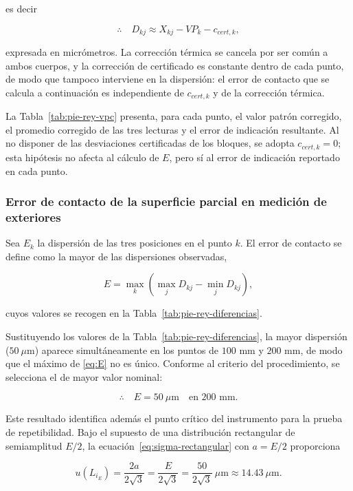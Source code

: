 es decir

\begin{equation}
  \therefore\quad D_{kj} \approx X_{kj} - VP_k - c_{cert,k},
  \label{eq:D}
\end{equation}

expresada en micrómetros. La corrección térmica se cancela por ser común a ambos
cuerpos, y la corrección de certificado es constante dentro de cada punto, de modo
que tampoco interviene en la dispersión: el error de contacto que se calcula a
continuación es independiente de $c_{cert,k}$ y de la corrección térmica.

La Tabla~\ref{tab:pie-rey-vpc} presenta, para cada punto, el valor patrón corregido,
el promedio corregido de las tres lecturas y el error de indicación resultante. Al no
disponer de las desviaciones certificadas de los bloques, se adopta $c_{cert,k} = 0$;
esta hipótesis no afecta al cálculo de $E$, pero sí al error de indicación reportado
en cada punto.



\subsubsection*{Error de contacto de la superficie parcial en medición de exteriores}

Sea $E_k$ la dispersión de las tres posiciones en el punto $k$. El error de contacto
se define como la mayor de las dispersiones observadas,

\begin{equation}
  E = \max_k \left( \max_j D_{kj} - \min_j D_{kj} \right),
  \label{eq:E}
\end{equation}

cuyos valores se recogen en la Tabla~\ref{tab:pie-rey-diferencias}.



Sustituyendo los valores de la Tabla~\ref{tab:pie-rey-diferencias}, la mayor
dispersión ($50\ \mu\text{m}$) aparece simultáneamente en los puntos de $100$ mm y
$200$ mm, de modo que el máximo de \eqref{eq:E} no es único. Conforme al criterio del
procedimiento, se selecciona el de mayor valor nominal:

\begin{equation}
  \therefore\quad E = 50\ \mu\text{m} \quad \text{en } 200 \text{ mm}.
  \label{eq:E-valor}
\end{equation}

Este resultado identifica además el punto crítico del instrumento para la prueba de
repetibilidad. Bajo el supuesto de una distribución rectangular de semiamplitud
$E/2$, la ecuación~\eqref{eq:sigma-rectangular} con $a = E/2$ proporciona

\begin{equation}
  u(L_{i_E}) = \frac{2a}{2\sqrt{3}} = \frac{E}{2\sqrt{3}}
  = \frac{50}{2\sqrt{3}}\ \mu\text{m} \approx 14.43\ \mu\text{m}.
  \label{eq:sigma-LiE}
\end{equation}
